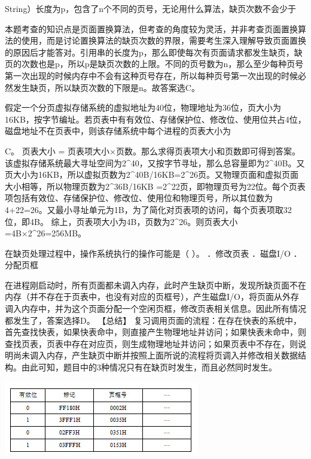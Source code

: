 String）长度为p，包含了n个不同的页号，无论用什么算法，缺页次数不会少于
\par{}
\begin{solution}本题考查的知识点是页面置换算法，但考查的角度较为灵活，并非考查页面置换算法的使用，而是讨论置换算法的缺页次数的界限，需要考生深入理解导致页面置换的原因后才能答对。引用串的长度为p，那么即使每次有页面请求都发生缺页，缺页的次数也是p，所以p是缺页次数的上限。不同的页号数为n，那么至少每种页号第一次出现的时候内存中不会有这种页号存在，所以每种页号第一次出现的时候必然发生缺页，所以缺页次数的下限是n。故答案选C。
\end{solution}
\question 假定一个分页虚拟存储系统的虚拟地址为40位，物理地址为36位，页大小为16KB，按字节编址。若页表中有有效位、存储保护位、修改位、使用位共占4位，磁盘地址不在页表中，则该存储系统中每个进程的页表大小为
\par{}
\begin{solution}C。 页表大小 = 页表项大小×页数。那么求得页表项大小和页数即可得到答案。
该虚拟存储系统最大寻址空间为2\^{}40，又按字节寻址，那么总容量即为2\^{}40B。又页大小为16KB，所以虚拟页数为2\^{}40B/16KB=2\^{}26页。又物理页面和虚拟页面大小相等，所以物理页数为2\^{}36B/16KB
=2\^{}22页，即物理页号为22位。每个页表项包括有效位、存储保护位、修改位、使用位和物理页号，所以其位数为4+22=26。又最小寻址单元为1B，为了简化对页表项的访问，每个页表项取32位，即4B。
综上，页表项大小为4B，页数为2\^{}26。则页表大小=4B×2\^{}26=256MB。
\end{solution}
\question 在缺页处理过程中，操作系统执行的操作可能是（ ）。 ．修改页表 ．磁盘I/O
．分配页框
\par{}
\begin{solution}在进程刚启动时，所有页面都未调入内存，此时产生缺页中断，发现所缺页面不在内存（并不存在于页表中，也没有对应的页框号），产生磁盘I/O，将页面从外存调入内存中，并为这个页面分配一个空闲页框，修改页表相关信息。因此所有情况都发生了，答案选择D。
【总结】
复习调用页面的流程：在存在快表的系统中，首先查找快表，如果快表命中，则直接产生物理地址并访问；如果快表未命中，则查找页表，页表中存在对应页，则生成物理地址并访问；如果页表中不存在，则说明尚未调入内存，产生缺页中断并按照上面所说的流程将页调入并修改相关数据结构。由此可知，题目中的3种情况只有在缺页时发生，而且必然同时发生。
\end{solution}
\question \includegraphics[width=3.36458in,height=1.26042in]{computerassets/44e3f2881e7837913afca6cad4646bcb.jpeg}~

